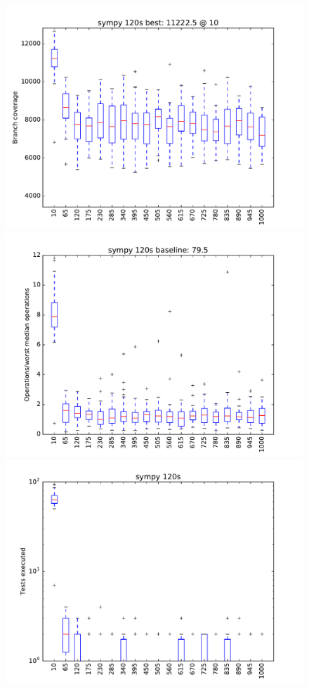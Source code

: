 \begin{figure}
\includegraphics[width=\columnwidth]{graphs/sympyrand120}
\includegraphics[width=\columnwidth]{graphs/opssympyrand120}
\includegraphics[width=\columnwidth]{graphs/execsympyrand120}
\end{figure}


